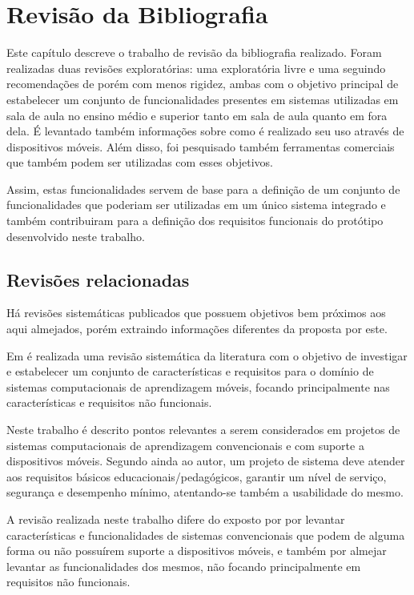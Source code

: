 \chapter{Revisão da Bibliografia}
\label{chap:revisao}

Este capítulo descreve o trabalho de revisão da bibliografia realizado. Foram realizadas duas revisões exploratórias: uma exploratória livre e uma seguindo recomendações de  porém com menos rigidez, ambas com o objetivo principal de estabelecer um conjunto de funcionalidades presentes em sistemas utilizadas em sala de aula no ensino médio e superior tanto em sala de aula quanto em fora dela. É levantado também informações sobre como é realizado seu uso através de dispositivos móveis. Além disso, foi pesquisado também ferramentas comerciais que também podem ser utilizadas com esses objetivos. 

Assim, estas funcionalidades servem de base para a definição de um conjunto de funcionalidades que poderiam ser utilizadas em um único sistema integrado e também contribuiram para a definição dos requisitos funcionais do protótipo desenvolvido neste trabalho.
 
\section{Revisões relacionadas}

Há revisões sistemáticas publicados que possuem objetivos bem próximos aos aqui almejados, porém extraindo informações diferentes da proposta por este.

Em  é realizada uma revisão sistemática da literatura com o objetivo de investigar e estabelecer um conjunto de características e requisitos para o domínio de sistemas computacionais de aprendizagem móveis, focando principalmente nas características e requisitos não funcionais.

Neste trabalho é descrito pontos relevantes a serem considerados em projetos de sistemas computacionais de aprendizagem convencionais e com suporte a dispositivos móveis. Segundo ainda ao autor, um projeto de sistema deve atender aos requisitos básicos educacionais/pedagógicos, garantir um nível de serviço, segurança e desempenho mínimo, atentando-se também a usabilidade do mesmo.

A revisão realizada neste trabalho difere do exposto por  por levantar características e funcionalidades de sistemas convencionais que podem de alguma forma ou não possuírem suporte a dispositivos móveis, e também por almejar levantar as funcionalidades dos mesmos, não focando principalmente em requisitos não funcionais.

